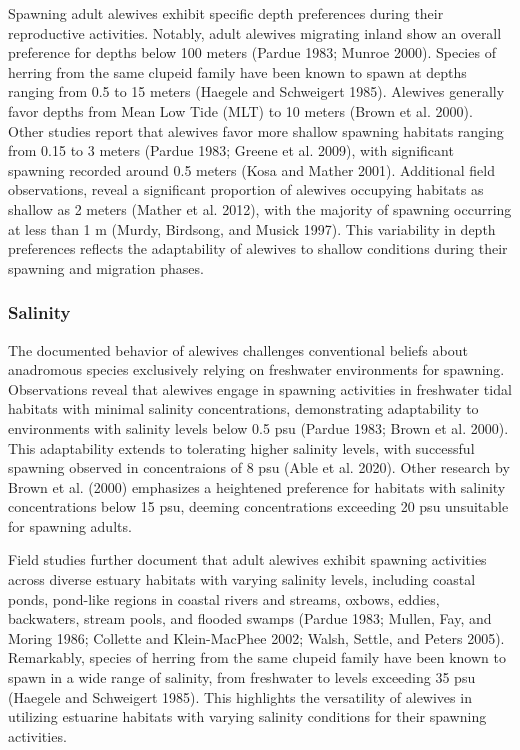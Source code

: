 \documentclass[
]{book}
\begin{document}
Spawning adult alewives exhibit specific depth preferences during their reproductive activities. Notably, adult alewives migrating inland show an overall preference for depths below 100 meters (Pardue 1983; Munroe 2000). Species of herring from the same clupeid family have been known to spawn at depths ranging from 0.5 to 15 meters (Haegele and Schweigert 1985). Alewives generally favor depths from Mean Low Tide (MLT) to 10 meters (Brown et al. 2000). Other studies report that alewives favor more shallow spawning habitats ranging from 0.15 to 3 meters (Pardue 1983; Greene et al. 2009), with significant spawning recorded around 0.5 meters (Kosa and Mather 2001). Additional field observations, reveal a significant proportion of alewives occupying habitats as shallow as 2 meters (Mather et al. 2012), with the majority of spawning occurring at less than 1 m (Murdy, Birdsong, and Musick 1997). This variability in depth preferences reflects the adaptability of alewives to shallow conditions during their spawning and migration phases.

\hypertarget{salinity}{%
\subsubsection{Salinity}\label{salinity}}

The documented behavior of alewives challenges conventional beliefs about anadromous species exclusively relying on freshwater environments for spawning. Observations reveal that alewives engage in spawning activities in freshwater tidal habitats with minimal salinity concentrations, demonstrating adaptability to environments with salinity levels below 0.5 psu (Pardue 1983; Brown et al. 2000). This adaptability extends to tolerating higher salinity levels, with successful spawning observed in concentraions of 8 psu (Able et al. 2020). Other research by Brown et al. (2000) emphasizes a heightened preference for habitats with salinity concentrations below 15 psu, deeming concentrations exceeding 20 psu unsuitable for spawning adults.

Field studies further document that adult alewives exhibit spawning activities across diverse estuary habitats with varying salinity levels, including coastal ponds, pond-like regions in coastal rivers and streams, oxbows, eddies, backwaters, stream pools, and flooded swamps (Pardue 1983; Mullen, Fay, and Moring 1986; Collette and Klein-MacPhee 2002; Walsh, Settle, and Peters 2005). Remarkably, species of herring from the same clupeid family have been known to spawn in a wide range of salinity, from freshwater to levels exceeding 35 psu (Haegele and Schweigert 1985). This highlights the versatility of alewives in utilizing estuarine habitats with varying salinity conditions for their spawning activities.
\end{document}
